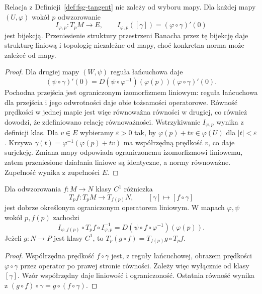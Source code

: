 \begin{twierdzenie}
\label{thm:fsg-tangent-chart}
Relacja z Definicji~\ref{def:fsg-tangent} nie zależy od
wyboru mapy. Dla każdej mapy $(U,\varphi)$ wokół $p$
odwzorowanie
\[
 I_{\varphi,p}:T_pM\to E,\qquad
 I_{\varphi,p}([\gamma])=(\varphi\circ\gamma)'(0)
\]
jest bijekcją. Przeniesienie struktury przestrzeni Banacha
przez tę bijekcję daje strukturę liniową i topologię
niezależne od mapy, choć konkretna norma może zależeć od mapy.
\end{twierdzenie}
\begin{proof}
Dla drugiej mapy $(W,\psi)$ reguła łańcuchowa daje
\[
 (\psi\circ\gamma)'(0)
 =D(\psi\circ\varphi^{-1})(\varphi(p))
   (\varphi\circ\gamma)'(0).
\]
Pochodna przejścia jest ograniczonym izomorfizmem liniowym:
reguła łańcuchowa dla przejścia i jego odwrotności daje
obie tożsamości operatorowe. Równość prędkości w jednej
mapie jest więc równoważna równości w drugiej, co również
dowodzi, że zdefiniowano relację równoważności.
Wstrzykiwanie $I_{\varphi,p}$ wynika z definicji klas.
Dla $v\in E$ wybieramy $\varepsilon>0$ tak, by
$\varphi(p)+tv\in\varphi(U)$ dla $|t|<\varepsilon$.
Krzywa $\gamma(t)=\varphi^{-1}(\varphi(p)+tv)$ ma
współrzędną prędkość $v$, co daje surjekcję.
Zmiana mapy odpowiada ograniczonemu izomorfizmowi liniowemu,
zatem przeniesione działania liniowe są identyczne, a normy
równoważne. Zupełność wynika z zupełności $E$.
\end{proof}

\begin{twierdzenie}
\label{thm:fsg-tangent-map}
Dla odwzorowania $f:M\to N$ klasy $C^1$ różniczka
\[
 T_pf:T_pM\to T_{f(p)}N,\qquad [\gamma]\mapsto[f\circ\gamma]
\]
jest dobrze określonym ograniczonym operatorem liniowym.
W mapach $\varphi,\psi$ wokół $p,f(p)$ zachodzi
\[
 I_{\psi,f(p)}\circ T_pf\circ I_{\varphi,p}^{-1}
 =D(\psi\circ f\circ\varphi^{-1})(\varphi(p)).
\]
Jeżeli $g:N\to P$ jest klasy $C^1$, to
$T_p(g\circ f)=T_{f(p)}g\circ T_pf$.
\end{twierdzenie}
\begin{proof}
Współrzędna prędkość $f\circ\gamma$ jest, z reguły
łańcuchowej, obrazem prędkości $\varphi\circ\gamma$
przez operator po prawej stronie równości. Zależy więc
wyłącznie od klasy $[\gamma]$. Wzór współrzędny
daje liniowość i ograniczoność. Ostatnia równość wynika
z $(g\circ f)\circ\gamma=g\circ(f\circ\gamma)$.
\end{proof}

